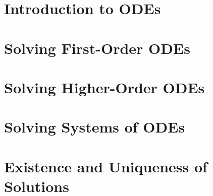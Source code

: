 \documentclass{report}
\begin{document}
	
	\thispagestyle{empty}
	\newpage%
	\tableofcontents
  
  \chapter{Introduction to ODEs}
  
  \chapter{Solving First-Order ODEs}
  
  \chapter{Solving Higher-Order ODEs}
  
  \chapter{Solving Systems of ODEs}
  
  \chapter{Existence and Uniqueness of Solutions}
  
  
\end{document}
